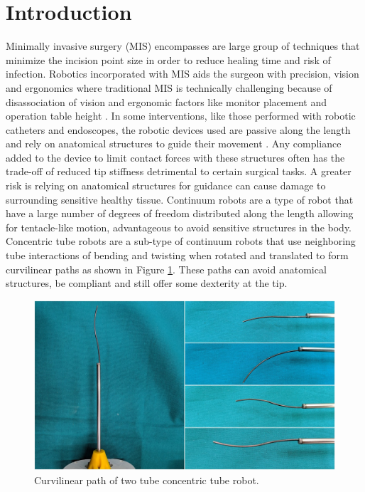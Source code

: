 \section{Introduction}
\label{intro}
Minimally invasive surgery (MIS) encompasses are large group of techniques that minimize the incision point size in order to reduce healing time and risk of infection. Robotics incorporated with MIS aids the surgeon with precision, vision and ergonomics where traditional MIS is technically challenging because of disassociation of vision and ergonomic factors like monitor placement and operation table height \cite{palep2009robotic}. In some interventions, like those performed with robotic catheters and endoscopes, the robotic devices used are passive along the length and rely on anatomical structures to guide their movement \cite{dupont2012concentric}. Any compliance added to the device to limit contact forces with these structures often has the trade-off of reduced tip stiffness detrimental to certain surgical tasks. A greater risk is relying on anatomical structures for guidance can cause damage to surrounding sensitive healthy tissue. Continuum robots are a type of robot that have a large number of degrees of freedom distributed along the length allowing for tentacle-like motion, advantageous to avoid sensitive structures in the body. Concentric tube robots are a sub-type of continuum robots that use neighboring tube interactions of bending and twisting when rotated and translated to form curvilinear paths as shown in Figure \ref{fig:curvilinear-paths}. These paths can avoid anatomical structures, be compliant and still offer some dexterity at the tip.
\begin{figure}
  \includegraphics[width=\linewidth]{ctr-collage.jpg}
\caption{Curvilinear path of two tube concentric tube robot.}
\label{fig:curvilinear-paths}
\end{figure}

